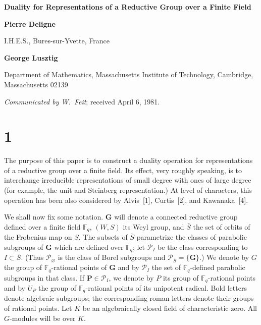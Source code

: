 \documentclass[10pt,a4paper]{article}
\theoremstyle{plain}
\theoremstyle{definition}
\theoremstyle{remark}
\newcommand{\F}{\mathbb{F}}
\newcommand{\cP}{\mathcal{P}}
\newcommand{\bG}{\mathbf{G}}
\newcommand{\bP}{\mathbf{P}}
\begin{document}

\thispagestyle{empty}
\begin{center}
{\Large\bfseries Duality for Representations of a Reductive Group over a Finite Field\par}
\vspace{5pt}
{\normalsize\bfseries Pierre Deligne}\par
{\small I.H.E.S., Bures-sur-Yvette, France}\par
\vspace{2pt}
{\normalsize\bfseries George Lusztig}\par
{\small Department of Mathematics, Massachusetts Institute of Technology, Cambridge, Massachusetts 02139}\par
\vspace{4pt}
{\small \textit{Communicated by W.~Feit}; received April 6, 1981.}\par
\end{center}

\section*{1}

The purpose of this paper is to construct a duality operation for representations of a reductive group over a finite field. Its effect, very roughly speaking, is to interchange irreducible representations of small degree with ones of large degree (for example, the unit and Steinberg representation.) At level of characters, this operation has been also considered by Alvis~[1], Curtis~[2], and Kawanaka~[4].

We shall now fix some notation. $\bG$ will denote a connected reductive group defined over a finite field $\F_q$, $(W,S)$ its Weyl group, and $\bar S$ the set of orbits of the Frobenius map on $S$. The subsets of $\bar S$ parametrize the classes of parabolic subgroups of $\bG$ which are defined over $\F_q$; let $\cP_I$ be the class corresponding to $I \subset \bar S$. (Thus $\cP_\varnothing$ is the class of Borel subgroups and $\cP_{\bar S}=\{\bG\}$.) We denote by $G$ the group of $\F_q$-rational points of $\bG$ and by $\cP_I$ the set of $\F_q$-defined parabolic subgroups in that class. If $\bP \in \cP_I$, we denote by $P$ its group of $\F_q$-rational points and by $U_P$ the group of $\F_q$-rational points of its unipotent radical. Bold letters denote algebraic subgroups; the corresponding roman letters denote their groups of rational points. Let $K$ be an algebraically closed field of characteristic zero. All $G$-modules will be over $K$.
\end{document}
